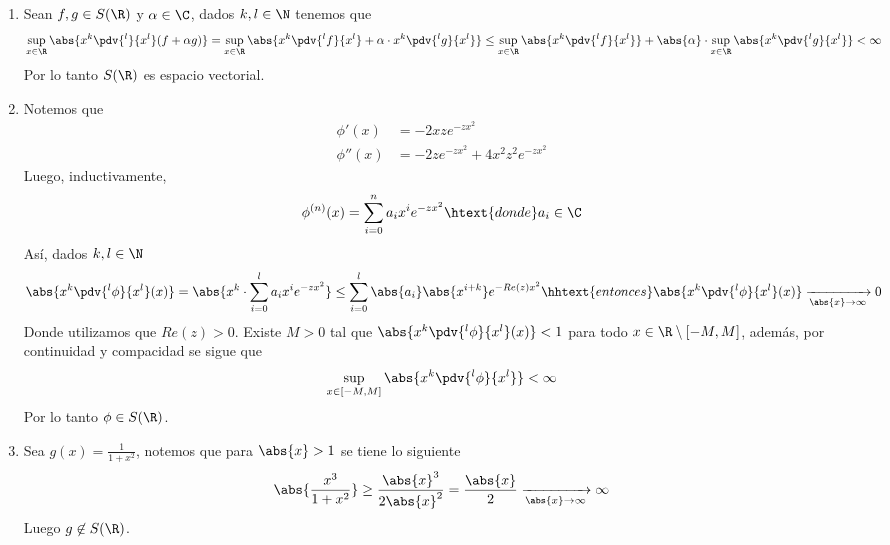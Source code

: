 \documentclass{article}
\begin{document}
\begin{enumerate}
    \item Sean $f,g\in S(\R)$ y $\alpha\in\C$, dados $k,l\in\N$ tenemos que
    \begin{equation*}
        \sup_{x\in\R}\abs{x^{k}\pdv{^{l}}{x^{l}}(f+\alpha g)}
        =\sup_{x\in\R}\abs{x^{k}\pdv{^{l}f}{x^{l}}+\alpha\cdot x^{k}\pdv{^{l}g}{x^{l}}}
        \leq\sup_{x\in\R}\abs{x^{k}\pdv{^{l}f}{x^{l}}}
        +\abs{\alpha}\cdot\sup_{x\in\R}\abs{x^{k}\pdv{^{l}g}{x^{l}}}<\infty
    \end{equation*}
    Por lo tanto $S(\R)$ es espacio vectorial.

    \item Notemos que
    \begin{align*}
        \phi'(x) &= -2xze^{-zx^{2}} \\
        \phi''(x) &= -2ze^{-zx^{2}}+4x^{2}z^{2}e^{-zx^{2}}
    \end{align*}
    Luego, inductivamente,
    \begin{equation*}
        \phi^{(n)}(x)=\sum_{i=0}^{n}a_{i}x^{i}e^{-zx^{2}}\htext{donde }a_{i}\in\C
    \end{equation*}
    Así, dados $k,l\in\N$
    \begin{equation*}
        \abs{x^{k}\pdv{^{l}\phi}{x^{l}}(x)}=\abs{x^{k}\cdot\sum_{i=0}^{l}a_{i}x^{i}e^{-zx^{2}}}
        \leq\sum_{i=0}^{l}\abs{a_{i}}\abs{x^{i+k}}e^{-Re(z)x^{2}}
        \hhtext{entonces}
        \abs{x^{k}\pdv{^{l}\phi}{x^{l}}(x)}\xrightarrow[\abs{x}\to\infty]{}0
    \end{equation*}
    Donde utilizamos que $Re(z)>0$. Existe $M>0$ tal que $\abs{x^{k}\pdv{^{l}\phi}{x^{l}}(x)}<1$ 
    para todo $x\in\R\setminus[-M,M]$, además, por continuidad y compacidad se sigue que
    \begin{equation*}
        \sup_{x\in[-M,M]}\abs{x^{k}\pdv{^{l}\phi}{x^{l}}}<\infty
    \end{equation*}
    Por lo tanto $\phi\in S(\R)$.
    
    \item Sea $g(x)=\frac{1}{1+x^{2}}$, notemos que para $\abs{x}>1$ se tiene lo siguiente
    \begin{equation*}
        \abs{\frac{x^{3}}{1+x^{2}}}\geq\frac{\abs{x}^{3}}{2\abs{x}^{2}}
        =\frac{\abs{x}}{2}\xrightarrow[\abs{x}\to\infty]{}\infty
    \end{equation*}
    Luego $g\not\in S(\R)$.
    

\end{enumerate}
\end{document}
